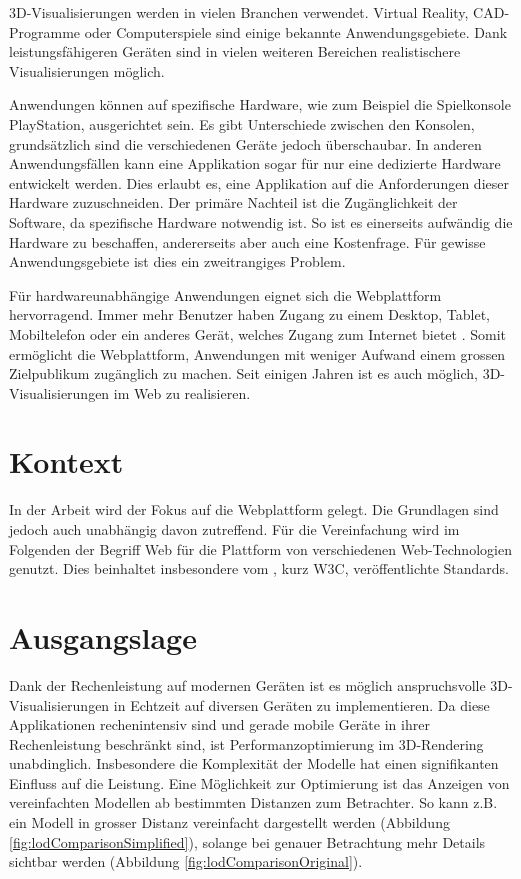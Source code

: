 
3D-Visualisierungen werden in vielen Branchen verwendet. Virtual Reality, CAD-Programme oder Computerspiele sind einige bekannte Anwendungsgebiete. Dank leistungsfähigeren Geräten sind in vielen weiteren Bereichen realistischere Visualisierungen möglich.

Anwendungen können auf spezifische Hardware, wie zum Beispiel die Spielkonsole PlayStation, ausgerichtet sein. Es gibt Unterschiede zwischen den Konsolen, grundsätzlich sind die verschiedenen Geräte jedoch überschaubar. In anderen Anwendungsfällen kann eine Applikation sogar für nur eine dedizierte Hardware entwickelt werden. Dies erlaubt es, eine Applikation auf die Anforderungen dieser Hardware zuzuschneiden. Der primäre Nachteil ist die Zugänglichkeit der Software, da spezifische Hardware notwendig ist. So ist es einerseits aufwändig die Hardware zu beschaffen, andererseits aber auch eine Kostenfrage. Für gewisse Anwendungsgebiete ist dies ein zweitrangiges Problem.

Für hardwareunabhängige Anwendungen eignet sich die Webplattform hervorragend.
Immer mehr Benutzer haben Zugang zu einem Desktop, Tablet, Mobiltelefon oder ein anderes Gerät, welches Zugang zum Internet bietet \cite{peopleWithInternetAccess}.
Somit ermöglicht die Webplattform, Anwendungen mit weniger Aufwand einem grossen Zielpublikum zugänglich zu machen.
Seit einigen Jahren ist es auch möglich, 3D-Visualisierungen im Web zu realisieren.

\section{Kontext}
In der Arbeit wird der Fokus auf die Webplattform gelegt. Die Grundlagen sind jedoch auch unabhängig davon zutreffend.
Für die Vereinfachung wird im Folgenden der Begriff Web für die Plattform von verschiedenen Web-Technologien genutzt. Dies beinhaltet insbesondere vom , kurz W3C, veröffentlichte Standards.

\section{Ausgangslage}
Dank der Rechenleistung auf modernen Geräten ist es möglich anspruchsvolle 3D-Visualisierungen in Echtzeit auf diversen Geräten zu implementieren. Da diese Applikationen rechenintensiv sind und gerade mobile Geräte in ihrer Rechenleistung beschränkt sind, ist Performanzoptimierung im 3D-Rendering unabdinglich. Insbesondere die Komplexität der Modelle hat einen signifikanten Einfluss auf die Leistung.
Eine Möglichkeit zur Optimierung ist das Anzeigen von vereinfachten Modellen ab bestimmten Distanzen zum Betrachter. So kann z.B. ein Modell in grosser Distanz vereinfacht dargestellt werden (Abbildung \ref{fig:lodComparisonSimplified}), solange bei genauer Betrachtung mehr Details sichtbar werden (Abbildung \ref{fig:lodComparisonOriginal}).

